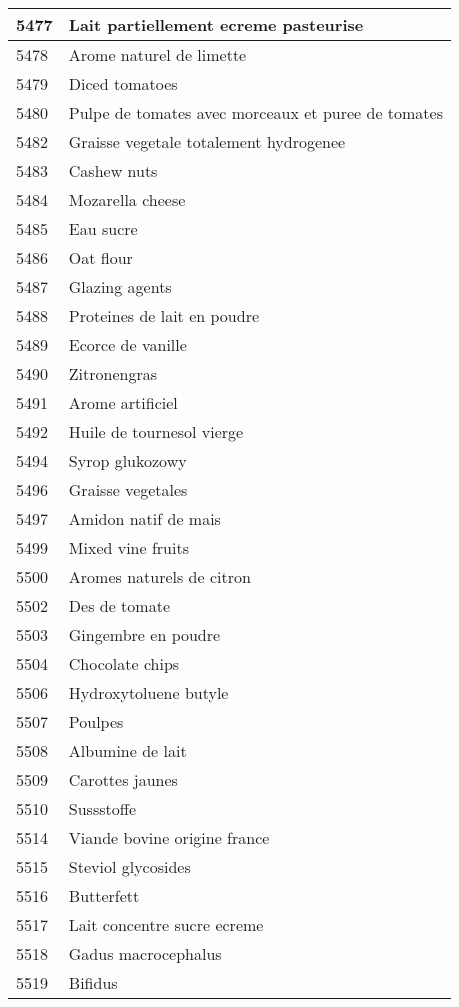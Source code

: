 \begin{longtable}{|l|l|}
5477 & Lait partiellement ecreme pasteurise \\ \hline 
5478 & Arome naturel de limette \\ \hline 
5479 & Diced tomatoes \\ \hline 
5480 & Pulpe de tomates avec morceaux et puree de tomates \\ \hline 
5482 & Graisse vegetale totalement hydrogenee \\ \hline 
5483 & Cashew nuts \\ \hline 
5484 & Mozarella cheese \\ \hline 
5485 & Eau sucre \\ \hline 
5486 & Oat flour \\ \hline 
5487 & Glazing agents \\ \hline 
5488 & Proteines de lait en poudre \\ \hline 
5489 & Ecorce de vanille \\ \hline 
5490 & Zitronengras \\ \hline 
5491 & Arome artificiel \\ \hline 
5492 & Huile de tournesol vierge \\ \hline 
5494 & Syrop glukozowy \\ \hline 
5496 & Graisse vegetales \\ \hline 
5497 & Amidon natif de mais \\ \hline 
5499 & Mixed vine fruits \\ \hline 
5500 & Aromes naturels de citron \\ \hline 
5502 & Des de tomate \\ \hline 
5503 & Gingembre en poudre \\ \hline 
5504 & Chocolate chips \\ \hline 
5506 & Hydroxytoluene butyle \\ \hline 
5507 & Poulpes \\ \hline 
5508 & Albumine de lait \\ \hline 
5509 & Carottes jaunes \\ \hline 
5510 & Sussstoffe \\ \hline 
5514 & Viande bovine origine france \\ \hline 
5515 & Steviol glycosides \\ \hline 
5516 & Butterfett \\ \hline 
5517 & Lait concentre sucre ecreme \\ \hline 
5518 & Gadus macrocephalus \\ \hline 
5519 & Bifidus \\ \hline 

\end{longtable}

